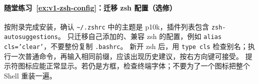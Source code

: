 \paragraph*{随堂练习~\ref{ex:v1-zsh-config}：迁移 zsh 配置（选修）}
\begin{solution}
按附录完成安装，确认 \texttt{\textasciitilde/.zshrc} 中的主题是 p10k，插件列表包含 \texttt{zsh-autosuggestions}。
只迁移自己添加的、兼容 zsh 的配置，例如 \texttt{alias cls='clear'}，不要整份复制 \texttt{.bashrc}。
新开 zsh 后，用 \texttt{type cls} 检查别名；执行一次普通命令，再输入相同前缀，应该出现历史建议，按右方向键可接受。
提示符图标应能正常显示。若仍是方框，检查终端字体；不要为了一个图标把整个 Shell 重装一遍。
\end{solution}

\endgroup
